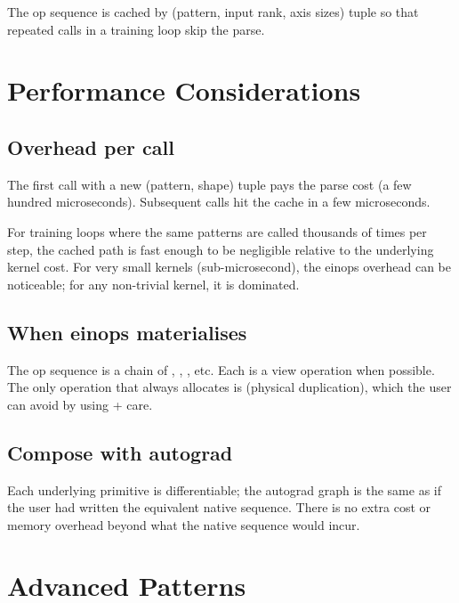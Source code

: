The op sequence is cached by (pattern, input rank, axis sizes)
tuple so that repeated calls in a training loop skip the parse.

\section{Performance Considerations}
\label{sec:einops:performance}

\subsection{Overhead per call}
\label{ssec:einops:overhead_per_call}

The first call with a new (pattern, shape) tuple pays the parse
cost (a few hundred microseconds). Subsequent calls hit the cache
in a few microseconds.

For training loops where the same patterns are called thousands
of times per step, the cached path is fast enough to be
negligible relative to the underlying kernel cost. For very
small kernels (sub-microsecond), the einops overhead can be
noticeable; for any non-trivial kernel, it is dominated.

\subsection{When einops materialises}
\label{ssec:einops:when_materialise}

The op sequence is a chain of , ,
, etc. Each is a view operation when possible. The
only operation that always allocates is  (physical
duplication), which the user can avoid by using  +
care.

\subsection{Compose with autograd}
\label{ssec:einops:compose_autograd}

Each underlying primitive is differentiable; the autograd graph
is the same as if the user had written the equivalent native
sequence. There is no extra cost or memory overhead beyond what
the native sequence would incur.

\section{Advanced Patterns}
\label{sec:einops:advanced_patterns}

